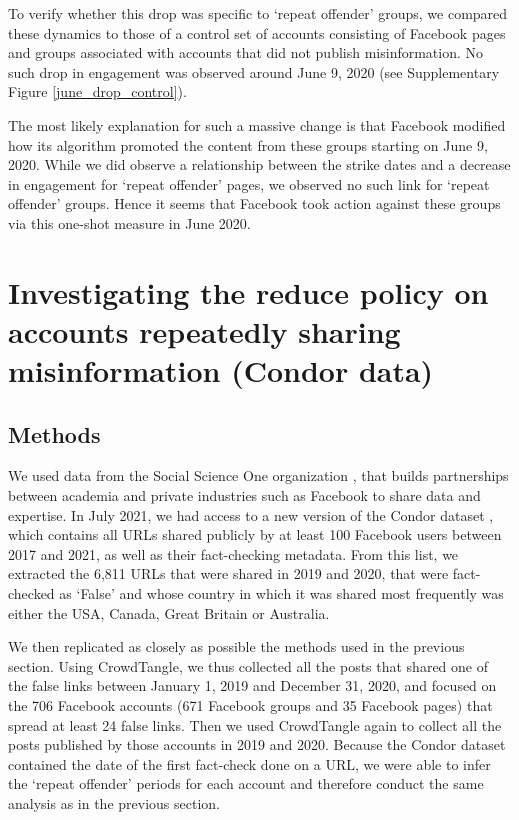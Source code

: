 \documentclass[review]{elsarticle}
\begin{document}
To verify whether this drop was specific to `repeat offender' groups, we compared these dynamics to those of a control set of accounts consisting of Facebook pages and groups associated with accounts that did not publish misinformation.
No such drop in engagement was observed around June 9, 2020 (see Supplementary Figure \ref{june_drop_control}).

The most likely explanation for such a massive change is that Facebook modified how its algorithm promoted the content from these groups starting on June 9, 2020.
While we did observe a relationship between the strike dates and a decrease in engagement for `repeat offender' pages, we observed no such link for `repeat offender' groups.
Hence it seems that Facebook took action against these groups via this one-shot measure in June 2020.

\section{Investigating the reduce policy on accounts repeatedly sharing misinformation (Condor data)}

\subsection{Methods}

We used data from the Social Science One organization \cite{king2020new}, that builds partnerships between academia and private industries such as Facebook to share data and expertise. 
In July 2021, we had access to a new version of the Condor dataset \cite{messing2020facebook}, which contains all URLs shared publicly by at least 100 Facebook users between 2017 and 2021, as well as their fact-checking metadata. 
From this list, we extracted the 6,811 URLs that were shared in 2019 and 2020, that were fact-checked as `False' and whose country in which it was shared most frequently was either the USA, Canada, Great Britain or Australia.

We then replicated as closely as possible the methods used in the previous section. 
Using CrowdTangle, we thus collected all the posts that shared one of the false links between January 1, 2019 and December 31, 2020, and focused on the 706 Facebook accounts (671 Facebook groups and 35 Facebook pages) that spread at least 24 false links. 
Then we used CrowdTangle again to collect all the posts published by those accounts in 2019 and 2020. 
Because the Condor dataset contained the date of the first fact-check done on a URL, we were able to infer the `repeat offender' periods for each account and therefore conduct the same analysis as in the previous section.
\end{document}
